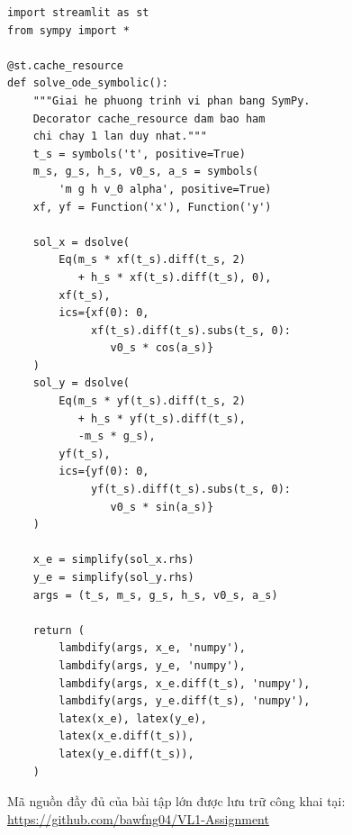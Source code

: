 \begin{lstlisting}[style=pythonstyle, caption={Hàm giải phương trình vi phân với cơ chế nhớ tạm (cache) trong Streamlit}]
import streamlit as st
from sympy import *

@st.cache_resource
def solve_ode_symbolic():
    """Giai he phuong trinh vi phan bang SymPy.
    Decorator cache_resource dam bao ham 
    chi chay 1 lan duy nhat."""
    t_s = symbols('t', positive=True)
    m_s, g_s, h_s, v0_s, a_s = symbols(
        'm g h v_0 alpha', positive=True)
    xf, yf = Function('x'), Function('y')

    sol_x = dsolve(
        Eq(m_s * xf(t_s).diff(t_s, 2) 
           + h_s * xf(t_s).diff(t_s), 0),
        xf(t_s),
        ics={xf(0): 0, 
             xf(t_s).diff(t_s).subs(t_s, 0): 
                v0_s * cos(a_s)}
    )
    sol_y = dsolve(
        Eq(m_s * yf(t_s).diff(t_s, 2) 
           + h_s * yf(t_s).diff(t_s), 
           -m_s * g_s),
        yf(t_s),
        ics={yf(0): 0, 
             yf(t_s).diff(t_s).subs(t_s, 0): 
                v0_s * sin(a_s)}
    )

    x_e = simplify(sol_x.rhs)
    y_e = simplify(sol_y.rhs)
    args = (t_s, m_s, g_s, h_s, v0_s, a_s)
    
    return (
        lambdify(args, x_e, 'numpy'),
        lambdify(args, y_e, 'numpy'),
        lambdify(args, x_e.diff(t_s), 'numpy'),
        lambdify(args, y_e.diff(t_s), 'numpy'),
        latex(x_e), latex(y_e),
        latex(x_e.diff(t_s)), 
        latex(y_e.diff(t_s)),
    )
\end{lstlisting}

\vspace{0.3cm}
Mã nguồn đầy đủ của bài tập lớn được lưu trữ công khai tại: \url{https://github.com/bawfng04/VL1-Assignment}
